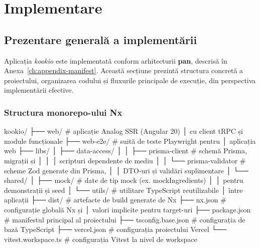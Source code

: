 \section{Implementare}\label{ch:impl}

\subsection{Prezentare generală a implementării}

Aplicația \textit{\gls{kookio}} este implementată conform arhitecturii \textbf{\gls{pan}}, descrisă în Anexa~\ref{ch:appendix-manifest}.
Această secțiune prezintă structura concretă a proiectului, organizarea codului și fluxurile principale de execuție, din perspectiva implementării efective.

\subsubsection{Structura monorepo-ului Nx}\label{subsec:monorepo-struct}
\vspace{0.3cm}
\begin{TreeVerb}
kookio/
├── web/                        # aplicație Analog SSR (Angular 20)
│                                 cu client tRPC și module funcționale
├── web-e2e/                    # suită de teste Playwright pentru
│                                 aplicația web
├── libs/
│   ├── data-access/
│   │   ├── prisma-client       # schemă Prisma, migrații și
│   │   │                         scripturi dependente de mediu
│   │   └── prisma-validator    # scheme Zod generate din Prisma,
│   │                             DTO-uri și validări suplimentare
│   └── shared/
│       ├── mock/               # date de tip mock (ex. mockIngredients)
│       │                         pentru demonstrații și seed
│       └── utils/              # utilitare TypeScript reutilizabile
│                                 între aplicații
├── dist/                       # artefacte de build generate de Nx
├── nx.json                     # configurație globală Nx și
│                                 valori implicite pentru target-uri
├── package.json                # manifestul principal al proiectului
├── tsconfig.base.json          # configurația de bază TypeScript
├── vercel.json                 # configurația proiectului Vercel
└── vitest.workspace.ts         # configurația Vitest la nivel de workspace
\end{TreeVerb}
\vspace{0.3cm}


